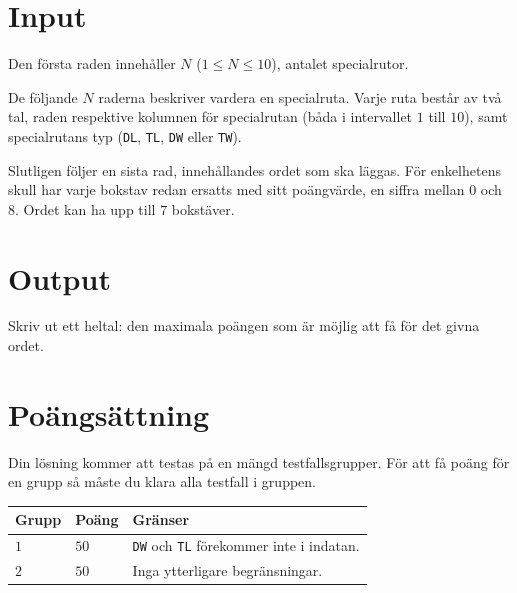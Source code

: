 \section*{Input}
Den första raden innehåller $N$ ($1\leq N \leq 10$), antalet specialrutor.

De följande $N$ raderna beskriver vardera en specialruta. Varje ruta består av två tal, raden respektive
kolumnen för specialrutan (båda i intervallet $1$ till $10$), samt specialrutans typ (\texttt{DL}, \texttt{TL}, \texttt{DW} eller \texttt{TW}).

Slutligen följer en sista rad, innehållandes ordet som ska läggas. För enkelhetens skull har varje bokstav redan ersatts med sitt poängvärde, en siffra mellan $0$ och $8$. Ordet kan ha upp till $7$ bokstäver.

\section*{Output}
Skriv ut ett heltal: den maximala poängen som är möjlig att få för det givna ordet.

\section*{Poängsättning}
Din lösning kommer att testas på en mängd testfallsgrupper.
För att få poäng för en grupp så måste du klara alla testfall i gruppen.

\noindent
\begin{tabular}{| l | l | p{12cm} |}
  \hline
  \textbf{Grupp} & \textbf{Poäng} & \textbf{Gränser} \\ \hline
  $1$    & $50$          & \texttt{DW} och \texttt{TL} förekommer inte i indatan.  \\ \hline
  $2$    & $50$          & Inga ytterligare begränsningar.  \\ \hline
\end{tabular}

